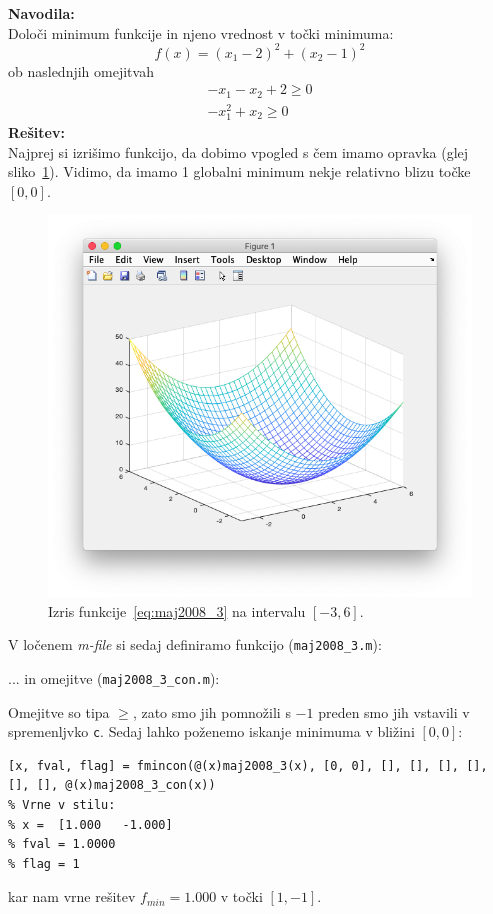 \documentclass[a4paper,11pt]{article}
\begin{document}
\textbf{Navodila:} \\
Določi minimum funkcije in njeno vrednost v točki minimuma:
\begin{equation} \label{eq:maj2008_3}
f(x) = (x_1 - 2)^2 + (x_2 - 1)^2
\end{equation}
ob naslednjih omejitvah
\begin{equation} \label{con:maj2008_3}
\begin{aligned}
-x_1 -x_2 + 2 \geq 0 \\
-x_1^2 + x_2 \geq 0
\end{aligned}
\end{equation}
\textbf{Rešitev:} \\
Najprej si izrišimo funkcijo, da dobimo vpogled s čem imamo opravka (glej sliko~\ref{img:maj2008_3_plot}). Vidimo, da imamo 1 globalni minimum nekje relativno blizu točke $[0, 0]$.

\begin{figure}[hbt]
\centering
\includegraphics[scale=.4]{images/maj2008_3_plot.png}
\caption{Izris funkcije~\ref{eq:maj2008_3} na intervalu $[-3, 6]$.}
\label{img:maj2008_3_plot}
\end{figure}

V ločenem \textit{m-file} si sedaj definiramo funkcijo (\texttt{maj2008\_3.m}):

... in omejitve (\texttt{maj2008\_3\_con.m}):

Omejitve so tipa $\geq$, zato smo jih pomnožili s $-1$ preden smo jih vstavili v spremenljvko \texttt{c}. Sedaj lahko poženemo iskanje minimuma v bližini $[0, 0]$:
\begin{lstlisting}
[x, fval, flag] = fmincon(@(x)maj2008_3(x), [0, 0], [], [], [], [], [], [], @(x)maj2008_3_con(x))
% Vrne v stilu:
% x =  [1.000   -1.000]
% fval = 1.0000
% flag = 1
\end{lstlisting}
kar nam vrne rešitev $f_{min} = 1.000$ v točki $[1, -1]$.
\end{document}
